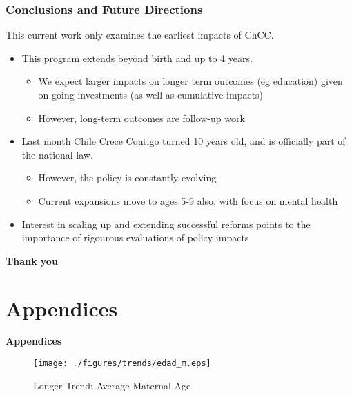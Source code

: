 \documentclass[10pt,letterpaper,subeqn,table]{beamer}
\begin{document}
\begin{frame}
\frametitle{Conclusions and Future Directions}
This current work only examines the earliest impacts of ChCC. \vspace{3mm}
\begin{itemize}
\item This program extends beyond birth and up to 4 years.
  \begin{itemize}
  \item We expect larger impacts on longer term outcomes (eg education) given on-going investments (as well as cumulative impacts)
  \item However, long-term outcomes are follow-up work
  \end{itemize}
\item Last month Chile Crece Contigo turned 10 years old, and is officially part of the national law.
  \begin{itemize}
  \item However, the policy is constantly evolving
  \item Current expansions move to ages 5-9 also, with focus on mental health
  \end{itemize}
\item Interest in scaling up and extending successful reforms points to the importance of rigourous evaluations of policy impacts
\end{itemize}
\end{frame}


\begin{frame}
\begin{center}
  \textbf{Thank you}
\end{center}
\end{frame}

\section{Appendices}
\begin{frame}
\begin{center}
  \textbf{Appendices}
\end{center}
\end{frame}


\setcounter{table}{0}
\renewcommand{\thetable}{A\arabic{table}}
\setcounter{figure}{0}
\renewcommand{\thefigure}{A\arabic{figure}}

\begin{frame}[label=longTrends]
\begin{figure}[htpb!]
  \begin{center}
  \centering
  \caption{Longer Trend: Average Maternal Age}
  \texttt{[image: ./figures/trends/edad\_m.eps]}
\end{center}
\end{figure}
\footnotesize{\hyperlink{Trends}{}}
\end{frame}
\end{document}

